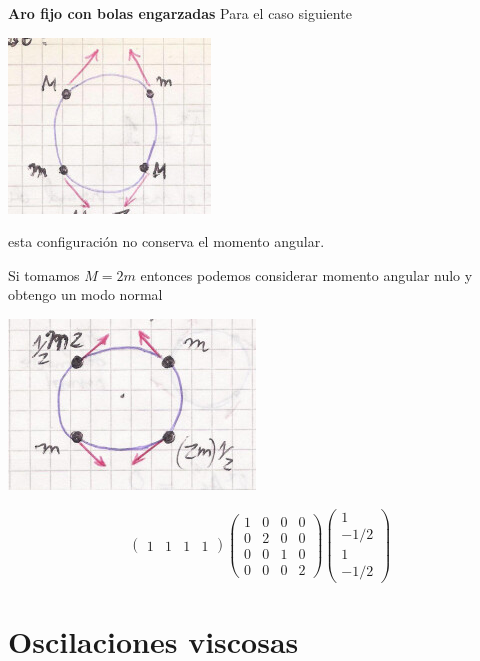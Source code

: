 \documentclass[10pt,oneside]{CBFT_book}
\begin{document}
\begin{ejemplo}{\bf Aro fijo con bolas engarzadas}
Para el caso siguiente 

\includegraphics[scale=0.5]{images/fig_mc_problema_aro_modos_normales_6.jpg} 

esta configuración no conserva el momento angular.

Si tomamos $M=2m$ entonces podemos considerar momento angular nulo y obtengo un modo normal

\includegraphics[scale=0.5]{images/fig_mc_problema_aro_modos_normales_7.jpg} 
 
\[
	\begin{pmatrix}
	 1 & 1 & 1 & 1 
	\end{pmatrix}
	\begin{pmatrix}
	 1 & 0 & 0 & 0 \\
	 0 & 2 & 0 & 0 \\
	 0 & 0 & 1 & 0 \\
	 0 & 0 & 0 & 2
	\end{pmatrix}
	\begin{pmatrix}
	 1 \\
	 -1/2 \\
	 1 \\
	 -1/2
	\end{pmatrix}
\] 
 
\end{ejemplo}




\section{Oscilaciones viscosas}
\end{document}
